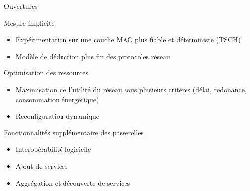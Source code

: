\begin{frame}{Ouvertures}
  \begin{block}{Mesure implicite}
    \begin{itemize}
        \item Expérimentation sur une couche MAC plus fiable et déterministe (TSCH)
        \item Modèle de déduction plus fin des protocoles réseau
    \end{itemize}
  \end{block}

  \begin{block}{Optimisation des ressources}
    \begin{itemize}
      \item Maximisation de l'utilité du réseau sous plusieurs critères (délai, redonance, consommation énergétique)
      \item Reconfiguration dynamique
    \end{itemize}
  \end{block}

  \begin{alertblock}{Fonctionnalités supplémentaire des passerelles}
    \begin{itemize}
      \item Interopérabilité logicielle
      \item Ajout de services
      \item Aggrégation et découverte de services
    \end{itemize}
  \end{alertblock}

\end{frame}

